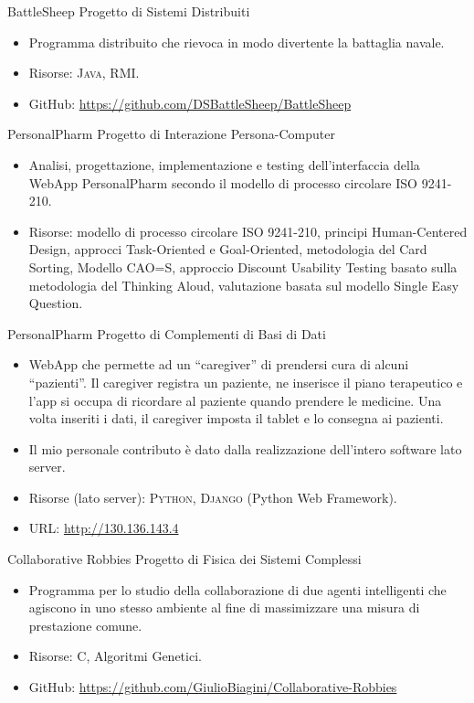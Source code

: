 {BattleSheep}
{Progetto di Sistemi Distribuiti}
{}
{}
{\begin{itemize}
	\item Programma distribuito che rievoca in modo divertente la battaglia
	navale.
	\item Risorse: \textsc{Java}, \textsc{RMI}.
	\item GitHub: \url{https://github.com/DSBattleSheep/BattleSheep}
\end{itemize}}

{PersonalPharm}
{Progetto di Interazione Persona-Computer}
{}
{}
{\begin{itemize}
	\item Analisi, progettazione, implementazione e testing dell'interfaccia
	della WebApp PersonalPharm secondo il modello di processo circolare ISO
	9241-210.
	\item Risorse: modello di processo circolare ISO 9241-210, principi
	Human-Centered Design, approcci Task-Oriented e Goal-Oriented, metodologia
	del Card Sorting, Modello CAO=S, approccio Discount Usability Testing basato
	sulla metodologia del Thinking Aloud, valutazione basata sul modello Single
	Easy Question.
\end{itemize}}

{PersonalPharm}
{Progetto di Complementi di Basi di Dati}
{}
{}
{\begin{itemize}
	\item WebApp che permette ad un ``caregiver'' di prendersi cura di alcuni
	``pazienti''. Il caregiver registra un paziente, ne inserisce il piano
	terapeutico e l'app si occupa di ricordare al paziente quando prendere le
	medicine. Una volta inseriti i dati, il caregiver imposta il tablet e lo
	consegna ai pazienti.
	\item Il mio personale contributo è dato dalla realizzazione dell'intero
	software lato server.
	\item Risorse (lato server): \textsc{Python}, \textsc{Django} (Python Web
	Framework).
	\item URL: \url{http://130.136.143.4}
\end{itemize}}

{Collaborative Robbies}
{Progetto di Fisica dei Sistemi Complessi}
{}
{}
{\begin{itemize}
	\item Programma per lo studio della collaborazione di due agenti
	intelligenti che agiscono in uno stesso ambiente al fine di massimizzare una
	misura di prestazione comune.
	\item Risorse: \textsc{C}, Algoritmi Genetici.
	\item GitHub: \url{https://github.com/GiulioBiagini/Collaborative-Robbies}
\end{itemize}}
